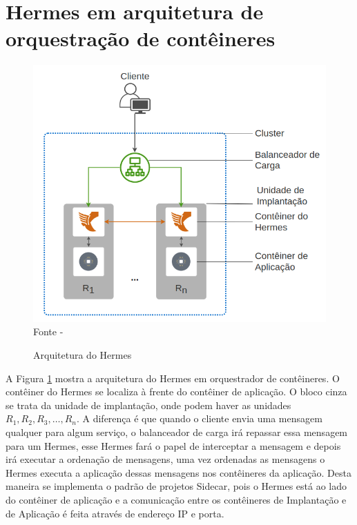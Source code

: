 \pagebreak

\section{Hermes em arquitetura de orquestração de contêineres}

\begin{figure}[!htb]
\centering
\caption{Arquitetura do Hermes}
\includegraphics[width=0.8\linewidth]{figures/hermes-overview.png}
{\flushleft Fonte - \textcite{renan2021hermes}}
\label{fig:hermes-architecture}
\end{figure}

A Figura \ref{fig:hermes-architecture} mostra a arquitetura do Hermes em orquestrador de contêineres. O contêiner do Hermes se localiza à frente do contêiner de aplicação. O bloco cinza se trata da unidade de implantação, onde podem haver as unidades $R_{1}, R_{2}, R_{3}, \ldots, R_{n}$. A diferença é que quando o cliente envia uma mensagem qualquer para algum serviço, o balanceador de carga irá repassar essa mensagem para um Hermes, esse Hermes fará o papel de interceptar a mensagem e depois irá executar a ordenação de mensagens, uma vez ordenadas as mensagens o Hermes executa a aplicação dessas mensagens nos contêineres da aplicação. Desta maneira se implementa o padrão de projetos Sidecar, pois o Hermes está ao lado do contêiner de aplicação e a comunicação entre os contêineres de Implantação e de Aplicação é feita através de endereço \gls{IP} e porta.




